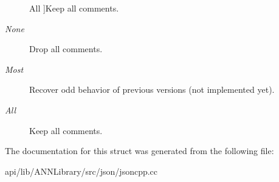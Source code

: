 \begin{Desc}
\begin{description}
{All\label{struct_json_1_1_comment_style_a51fc08f3518fd81eba12f340d19a3d0ca23cbf2619e7ca2201259b71212089d6b}
}]Keep all comments. \item[{\em 
None\label{struct_json_1_1_comment_style_a51fc08f3518fd81eba12f340d19a3d0ca36399eca8a3b9d995dd8ab0ecb6b5398}
}]Drop all comments. \item[{\em 
Most\label{struct_json_1_1_comment_style_a51fc08f3518fd81eba12f340d19a3d0ca0a9010dbb245e235801402fcc930e3ae}
}]Recover odd behavior of previous versions (not implemented yet). \item[{\em 
All\label{struct_json_1_1_comment_style_a51fc08f3518fd81eba12f340d19a3d0ca23cbf2619e7ca2201259b71212089d6b}
}]Keep all comments. \end{description}
\end{Desc}


The documentation for this struct was generated from the following file\+:\begin{DoxyCompactItemize}
\item 
api/lib/\+A\+N\+N\+Library/src/json/jsoncpp.\+cc\end{DoxyCompactItemize}
